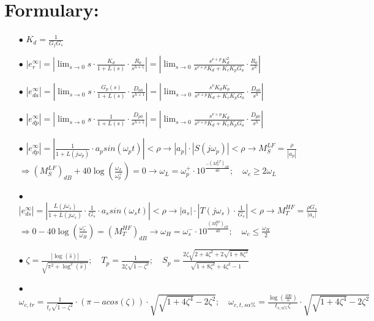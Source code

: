 \documentclass{article}
\begin{document}
	\section{Formulary:}
	\begin{enumerate}
		\item[$\bullet$] $K_d = \frac{1}{G_f G_s}$
		
		\item[$\bullet$] $\left| e_r^\infty \right| = \left| \displaystyle\lim_{s\to0} s \cdot \frac{K_d}{1+L(s)} \cdot \frac{R_0}{s^{h+1}} \right| = \left| \displaystyle\lim_{s\to0} \frac{s^{\nu+p}K_d^2}{s^{\nu+p}K_d+K_cK_pG_a}  \cdot \frac{R_0}{s^{h}} \right|$
		
		\item[$\bullet$] $\left| e_{da}^\infty \right| = \left| \displaystyle\lim_{s\to0} s \cdot \frac{G_p(s)}{1+L(s)} \cdot \frac{D_{a0}}{s^{h+1}} \right| = \left| \displaystyle\lim_{s\to0} \frac{s^{\nu}K_dK_p}{s^{\nu+p}K_d+K_cK_pG_a}  \cdot \frac{D_{a0}}{s^{h}} \right|$
		
		\item[$\bullet$] $\left| e_{dp}^\infty \right| = \left| \displaystyle\lim_{s\to0} s \cdot \frac{1}{1+L(s)} \cdot \frac{D_{p0}}{s^{h+1}} \right| = \left| \displaystyle\lim_{s\to0} \frac{s^{\nu+p}K_d}{s^{\nu+p}K_d+K_cK_pG_a}  \cdot \frac{D_{p0}}{s^{h}} \right|$
		
		\item[$\bullet$] $\left| e_{dp}^\infty \right| = \left| 
		\frac{1}{1+L(j\omega_p)} \cdot a_p sin\left(\omega_pt\right) \right| < \rho \to \left| a_p \right| \cdot \left| S(j\omega_p) \right| < \rho \to
		M_S^{LF} = \frac{\rho}{\left| a_p \right|}$ \\
		$ \Rightarrow (M_S^{LF})_{dB} + 40 \log \left( \frac{\omega_L}{\omega_p^+} \right) = 0
		\to \omega_L = \omega_p^+ \cdot 10^{\frac{-(M_S^{LF})_{dB}}{40}}; \quad
		\omega_c \geq 2\omega_L$
		
		\item[$\bullet$] $\left| e_{ds}^\infty \right| = \left| 
		\frac{L(j\omega_s)}{1+L(j\omega_s)} \cdot \frac{1}{G_s} \cdot a_s sin\left(\omega_st\right) \right| < \rho \to \left| a_s \right| \cdot \left| T(j\omega_s) \cdot \frac{1}{G_s} \right| < \rho \to
		M_T^{HF} = \frac{\rho G_s}{\left| a_s \right|}$ \\
		$ \Rightarrow 0 - 40 \log \left( \frac{\omega_s^-}{\omega_H} \right) = (M_T^{HF})_{dB} \to \omega_H = \omega_s^- \cdot 10^{\frac{(M_T^{HF})_{dB}}{40}}; \quad
		\omega_c \leq \frac{\omega_H}{2}$
		
		\item[$\bullet$] $ \zeta = \frac{\left| \log (\hat{s}) \right|}{\sqrt{\pi^2 + \log^2 (\hat{s})}}; \quad 
		T_p = \frac{1}{2\zeta \sqrt{1-\zeta^2}}; \quad
		S_p = \frac{2\zeta \sqrt{2+4\zeta^2+2\sqrt{1+8\zeta^2}}}{\sqrt{1+8\zeta^2}+4\zeta^2-1}$
		
		\item[$\bullet$] $ \omega_{c,tr} = \frac{1}{t_r\sqrt{1-\zeta^2}} \cdot
		(\pi - acos(\zeta)) \cdot \sqrt{\sqrt{1+4\zeta^4}-2\zeta^2}; \quad
		\omega_{c,t,s\alpha \%} = \frac{\log(\frac{100}{\alpha})}{t_{s,\alpha \%}\zeta} \cdot \sqrt{\sqrt{1+4\zeta^4}-2\zeta^2} $
		
	\end{enumerate}
	\newpage
\end{document}
